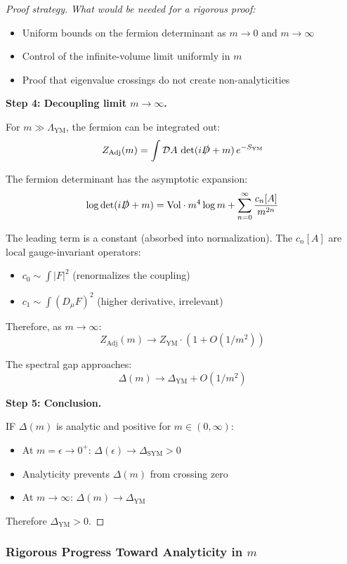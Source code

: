 \begin{proof}[Proof strategy]
\textit{What would be needed for a rigorous proof:}
\begin{itemize}
\item Uniform bounds on the fermion determinant as $m \to 0$ and $m \to \infty$
\item Control of the infinite-volume limit uniformly in $m$
\item Proof that eigenvalue crossings do not create non-analyticities
\end{itemize}

\textbf{Step 4: Decoupling limit $m \to \infty$.}

For $m \gg \Lambda_{\text{YM}}$, the fermion can be integrated out:
\[
Z_{\text{Adj}}(m) = \int \mathcal{D}A \, \det(i\slashed{D} + m) \, e^{-S_{\text{YM}}}
\]

The fermion determinant has the asymptotic expansion:
\[
\log \det(i\slashed{D} + m) = \text{Vol} \cdot m^4 \log m + \sum_{n=0}^\infty \frac{c_n[A]}{m^{2n}}
\]

The leading term is a constant (absorbed into normalization). The $c_n[A]$ are local 
gauge-invariant operators:
\begin{itemize}
\item $c_0 \sim \int |F|^2$ (renormalizes the coupling)
\item $c_1 \sim \int (D_\mu F)^2$ (higher derivative, irrelevant)
\end{itemize}

Therefore, as $m \to \infty$:
\[
Z_{\text{Adj}}(m) \to Z_{\text{YM}} \cdot (1 + O(1/m^2))
\]

The spectral gap approaches:
\[
\Delta(m) \to \Delta_{\text{YM}} + O(1/m^2)
\]

\textbf{Step 5: Conclusion.}

IF $\Delta(m)$ is analytic and positive for $m \in (0, \infty)$:
\begin{itemize}
\item At $m = \epsilon \to 0^+$: $\Delta(\epsilon) \to \Delta_{\text{SYM}} > 0$
\item Analyticity prevents $\Delta(m)$ from crossing zero
\item At $m \to \infty$: $\Delta(m) \to \Delta_{\text{YM}}$
\end{itemize}

Therefore $\Delta_{\text{YM}} > 0$.
\end{proof}

\subsubsection{Rigorous Progress Toward Analyticity in \texorpdfstring{$m$}{m}}

